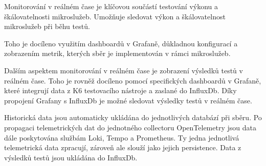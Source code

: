 Monitorování v reálném čase je klíčovou součástí testování výkonu a škálovatelnosti mikroslužeb. Umožňuje sledovat výkon a škálovatelnost mikroslužeb při běhu testů.

Toho je docíleno využitím dashboardů v Grafaně, důkladnou konfigurací a zobrazením metrik, kterých sběr je implementován v rámci mikroslužeb.

Dalším aspektem monitorování v reálném čase je zobrazení výsledků testů v reálném čase. Toho je rovněž docíleno pomocí specifických dashboardů v Grafaně, které integrují data z K6 testovacího nástroje a zaslané do InfluxDb. Díky propojení Grafany s InfluxDb je možné sledovat výsledky testů v reálném čase.


Historická data jsou automaticky ukládána do jednotlivých databází při sběru. Po propagaci telemetrických dat do jednotného collectoru OpenTelemetry jsou data dále poskytována službám Loki, Tempo a Prometheus. Ty jedna jednotlivá telemetrická data zpracují, zároveň ale slouží jako jejich persistence. Data z výsledků testů jsou ukládána do InfluxDb.







